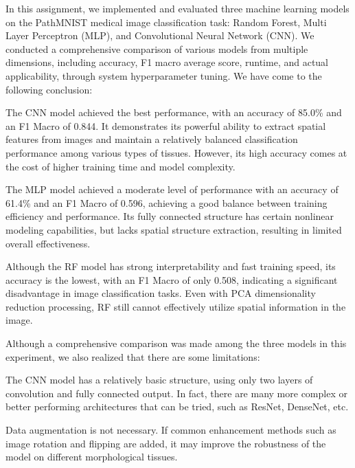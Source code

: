 
\noindent 

In this assignment, we implemented and evaluated three machine learning models on the PathMNIST medical image classification task: Random Forest, Multi Layer Perceptron (MLP), and Convolutional Neural Network (CNN). We conducted a comprehensive comparison of various models from multiple dimensions, including accuracy, F1 macro average score, runtime, and actual applicability, through system hyperparameter tuning.
We have come to the following conclusion:

\noindent 

The CNN model achieved the best performance, with an accuracy of 85.0\% and an F1 Macro of 0.844. It demonstrates its powerful ability to extract spatial features from images and maintain a relatively balanced classification performance among various types of tissues. However, its high accuracy comes at the cost of higher training time and model complexity.

\noindent 

The MLP model achieved a moderate level of performance with an accuracy of 61.4\% and an F1 Macro of 0.596, achieving a good balance between training efficiency and performance. Its fully connected structure has certain nonlinear modeling capabilities, but lacks spatial structure extraction, resulting in limited overall effectiveness.

\noindent 

Although the RF model has strong interpretability and fast training speed, its accuracy is the lowest, with an F1 Macro of only 0.508, indicating a significant disadvantage in image classification tasks. Even with PCA dimensionality reduction processing, RF still cannot effectively utilize spatial information in the image.

\noindent 

Although a comprehensive comparison was made among the three models in this experiment, we also realized that there are some limitations:

\noindent 

The CNN model has a relatively basic structure, using only two layers of convolution and fully connected output. In fact, there are many more complex or better performing architectures that can be tried, such as ResNet, DenseNet, etc.

\noindent 

Data augmentation is not necessary. If common enhancement methods such as image rotation and flipping are added, it may improve the robustness of the model on different morphological tissues.

